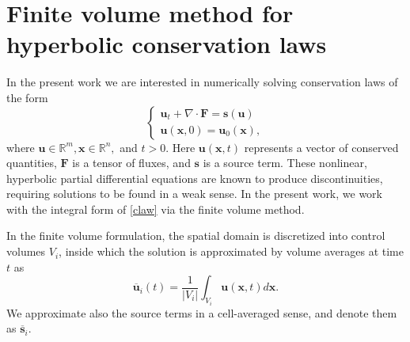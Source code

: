 \documentclass[]{article}
\begin{document}
\section{Finite volume method for hyperbolic conservation laws}

    In the present work we are interested in numerically solving conservation
    laws of the form
    \begin{equation}
    \begin{cases}
        \bm{u}_{t} + \nabla \cdot \bm{F} = \bm{s}(\bm{u}) \\
        \bm{u}(\bm{x},0) = \bm{u}_{0}(\bm{x}),
    \end{cases}
    \label{claw}
    \end{equation}
    where $\bm{u} \in \mathbb{R}^{m}, \bm{x} \in \mathbb{R}^{n},$ and $t > 0$.
    Here $\bm{u}(\bm{x},t)$ represents a vector of conserved quantities,
    $\bm{F}$ is a tensor of fluxes, and $\bm{s}$ is a source term. These
    nonlinear, hyperbolic partial differential equations are known to produce
    discontinuities, requiring solutions to be found in a weak sense. In the
    present work, we work with the integral form of \ref{claw} via the finite
    volume method.

    In the finite volume formulation, the spatial domain is discretized into
    control volumes $V_{i}$, inside which the solution is approximated by volume
    averages at time $t$ as
    \begin{equation}
        \overline{\bm{u}}_{i}(t) = \frac{1}{|V_{i}|} \int_{V_{i}} \bm{u}(\bm{x},t) d\bm{x}.
    \end{equation}
    We approximate also the source terms in a cell-averaged sense, and denote
    them as $\overline{\bm{s}}_{i}$.
\end{document}
